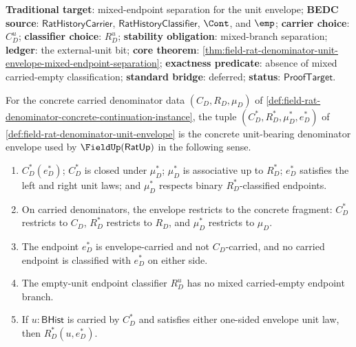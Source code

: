 \textbf{Traditional target}: mixed-endpoint separation for the unit envelope;
\textbf{BEDC source}: $\mathsf{RatHistoryCarrier}$,
$\mathsf{RatHistoryClassifier}$, $\Cont$, and $\emp$; \textbf{carrier choice}:
$C_D^u$; \textbf{classifier choice}: $R_D^u$; \textbf{stability
obligation}: mixed-branch separation; \textbf{ledger}: the external-unit bit;
\textbf{core theorem}:
\autoref{thm:field-rat-denominator-unit-envelope-mixed-endpoint-separation};
\textbf{exactness predicate}: absence of mixed carried-empty classification;
\textbf{standard bridge}: deferred; \textbf{status}: $\mathsf{ProofTarget}$.

\begin{theorem}
\label{thm:field-rat-denominator-unit-envelope-certificate}
For the concrete carried denominator data $(C_D,R_D,\mu_D)$ of
\autoref{def:field-rat-denominator-concrete-continuation-instance}, the tuple
$(C_D^\ast,R_D^\ast,\mu_D^\ast,e_D^\ast)$ of
\autoref{def:field-rat-denominator-unit-envelope} is the concrete
unit-bearing denominator envelope used by $\FieldUp(\mathsf{RatUp})$ in the
following sense.
\begin{enumerate}
  \item $C_D^\ast(e_D^\ast)$; $C_D^\ast$ is closed under $\mu_D^\ast$;
  $\mu_D^\ast$ is associative up to $R_D^\ast$; $e_D^\ast$ satisfies the left
  and right unit laws; and $\mu_D^\ast$ respects binary $R_D^\ast$-classified
  endpoints.
  \item On carried denominators, the envelope restricts to the concrete
  fragment: $C_D^\ast$ restricts to $C_D$, $R_D^\ast$ restricts to $R_D$, and
  $\mu_D^\ast$ restricts to $\mu_D$.
  \item The endpoint $e_D^\ast$ is envelope-carried and not $C_D$-carried, and
  no carried endpoint is classified with $e_D^\ast$ on either side.
  \item The empty-unit endpoint classifier $R_D^u$ has no mixed carried-empty
  endpoint branch.
  \item If $u:\mathsf{BHist}$ is carried by $C_D^\ast$ and satisfies either
  one-sided envelope unit law, then $R_D^\ast(u,e_D^\ast)$.
\end{enumerate}
\end{theorem}

